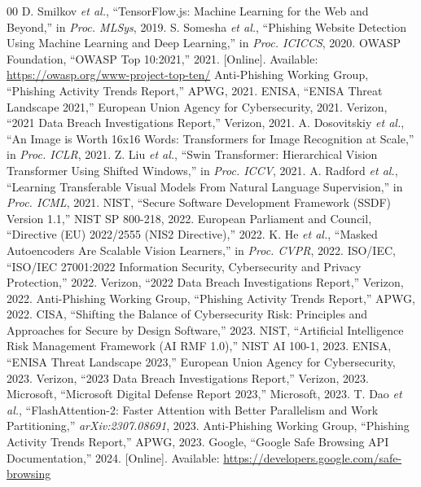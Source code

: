 \documentclass[conference]{IEEEtran}
\begin{document}
\begin{thebibliography}{00}
 D. Smilkov \textit{et al.}, ``TensorFlow.js: Machine Learning for the Web and Beyond,'' in \textit{Proc. MLSys}, 2019.
 S. Somesha \textit{et al.}, ``Phishing Website Detection Using Machine Learning and Deep Learning,'' in \textit{Proc. ICICCS}, 2020.
 OWASP Foundation, ``OWASP Top 10:2021,'' 2021. [Online]. Available: \url{https://owasp.org/www-project-top-ten/}
 Anti-Phishing Working Group, ``Phishing Activity Trends Report,'' APWG, 2021.
 ENISA, ``ENISA Threat Landscape 2021,'' European Union Agency for Cybersecurity, 2021.
 Verizon, ``2021 Data Breach Investigations Report,'' Verizon, 2021.
 A. Dosovitskiy \textit{et al.}, ``An Image is Worth 16x16 Words: Transformers for Image Recognition at Scale,'' in \textit{Proc. ICLR}, 2021.
 Z. Liu \textit{et al.}, ``Swin Transformer: Hierarchical Vision Transformer Using Shifted Windows,'' in \textit{Proc. ICCV}, 2021.
 A. Radford \textit{et al.}, ``Learning Transferable Visual Models From Natural Language Supervision,'' in \textit{Proc. ICML}, 2021.
 NIST, ``Secure Software Development Framework (SSDF) Version 1.1,'' NIST SP 800-218, 2022.
 European Parliament and Council, ``Directive (EU) 2022/2555 (NIS2 Directive),'' 2022.
 K. He \textit{et al.}, ``Masked Autoencoders Are Scalable Vision Learners,'' in \textit{Proc. CVPR}, 2022.
 ISO/IEC, ``ISO/IEC 27001:2022 Information Security, Cybersecurity and Privacy Protection,'' 2022.
 Verizon, ``2022 Data Breach Investigations Report,'' Verizon, 2022.
 Anti-Phishing Working Group, ``Phishing Activity Trends Report,'' APWG, 2022.
 CISA, ``Shifting the Balance of Cybersecurity Risk: Principles and Approaches for Secure by Design Software,'' 2023.
 NIST, ``Artificial Intelligence Risk Management Framework (AI RMF 1.0),'' NIST AI 100-1, 2023.
 ENISA, ``ENISA Threat Landscape 2023,'' European Union Agency for Cybersecurity, 2023.
 Verizon, ``2023 Data Breach Investigations Report,'' Verizon, 2023.
 Microsoft, ``Microsoft Digital Defense Report 2023,'' Microsoft, 2023.
 T. Dao \textit{et al.}, ``FlashAttention-2: Faster Attention with Better Parallelism and Work Partitioning,'' \textit{arXiv:2307.08691}, 2023.
 Anti-Phishing Working Group, ``Phishing Activity Trends Report,'' APWG, 2023.
 Google, ``Google Safe Browsing API Documentation,'' 2024. [Online]. Available: \url{https://developers.google.com/safe-browsing}

\end{thebibliography}
\end{document}

